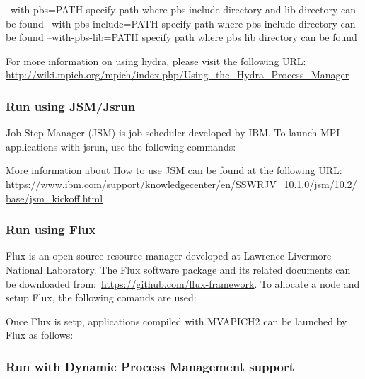     --with-pbs=PATH         specify path where pbs include directory
                            and lib directory can be found
    --with-pbs-include=PATH specify path where pbs include directory
                            can be found
    --with-pbs-lib=PATH     specify path where pbs lib directory can
                            be found

For more information on using hydra, please visit the following URL:
\url{http://wiki.mpich.org/mpich/index.php/Using_the_Hydra_Process_Manager}

\subsubsection{Run using JSM/Jsrun}
\label{sec:run-jsm}

Job Step Manager (JSM) is job scheduler developed by IBM. To launch MPI
applications with jsrun, use the following commands:


More information about How to use JSM can be found at the following URL:
\url{https://www.ibm.com/support/knowledgecenter/en/SSWRJV_10.1.0/jsm/10.2/base/jsm_kickoff.html}

\subsubsection{Run using Flux}
\label{sec:run-flux}

Flux is an open-source resource manager developed at Lawrence Livermore National
Laboratory. The Flux software package and its related documents can be
downloaded
from:~\href{https://github.com/flux-framework}{https://github.com/flux-framework}.
To allocate a node and setup Flux, the following comands are used:


Once Flux is setp, applications compiled with MVAPICH2 can be
launched by Flux as follows:


\subsubsection{Run with Dynamic Process Management support}
\label{subsec:dpm}

